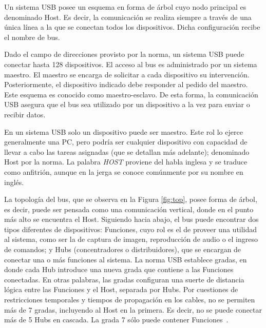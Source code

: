 Un sistema USB posee un esquema %
en forma de árbol cuyo nodo principal es denominado Host. Es decir, la comunicación se realiza siempre a través de una única línea a la que se conectan todos los dispositivos. Dicha configuración recibe el nombre de bus. 

Dado el campo de direcciones provisto por la norma, un sistema USB puede conectar hasta 128 dispositivos. El acceso al bus es administrado por un sistema maestro. El maestro se encarga de solicitar a cada dispositivo su intervención. Posteriormente, el dispositivo indicado debe responder al pedido del maestro. Este esquema es conocido como maestro-esclavo. De esta forma, la comunicación USB asegura que el bus sea utilizado por un dispositivo a la vez para enviar o recibir datos.%

En un sistema USB solo un dispositivo puede ser maestro. Este rol lo ejerce generalmente una PC, pero podría ser cualquier dispositivo con capacidad de llevar a cabo las tareas asignadas (que se detallan más adelante); denominado Host por la norma. La palabra {\it HOST} proviene del habla inglesa y se traduce como anfitrión, aunque en la jerga se conoce comúnmente por su nombre en inglés.%

La topología del bus, que se observa en la Figura \ref{fig:top}, posee forma de árbol, es decir, puede ser pensada como una comunicación vertical, donde en el punto más alto se encuentra el Host. Siguiendo hacia abajo, el bus puede encontrar dos tipos diferentes de dispositivos: Funciones, cuyo rol es el de proveer una utilidad al sistema, como ser la de captura de imagen, reproducción de audio o el ingreso de comandos; y Hubs (concentradores o distribuidores), que se encargan de conectar una o más funciones al sistema. La norma USB establece gradas, en donde cada Hub introduce una nueva grada que contiene a las Funciones conectadas. En otras palabras, las gradas configuran una suerte de distancia lógica entre las Funciones y el Host, separada por Hubs. Por cuestiones de restricciones temporales y tiempos de propagación en los cables, no se permiten más de 7 gradas, incluyendo al Host en la primera. Es decir, no se puede conectar más de 5 Hubs en cascada. La grada 7 sólo puede contener Funciones~\cite{USBspec}.%

